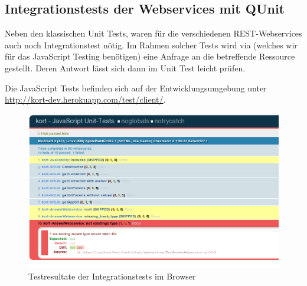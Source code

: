 \subsection{Integrationstests der Webservices mit QUnit}
Neben den klassischen Unit Tests, waren für die verschiedenen \gls{REST}-Webservices auch noch Integrationstest nötig.
Im Rahmen solcher Tests wird via  (welches wir für das JavaScript Testing benötigen) eine Anfrage an die betreffende Ressource gestellt.
Deren Antwort lässt sich dann im Unit Test leicht prüfen.

Die JavaScript Tests befinden sich auf der Entwicklungsumgebung unter \url{http://kort-dev.herokuapp.com/test/client/}.

\begin{figure}[H]
	\centering
	\includegraphics[width=\textwidth]{images/implementation/backend/qunit-skipped-test}
	\caption{Testresultate der Integrationstests im Browser}
	\label{image-qunit-skipped-test}
\end{figure}